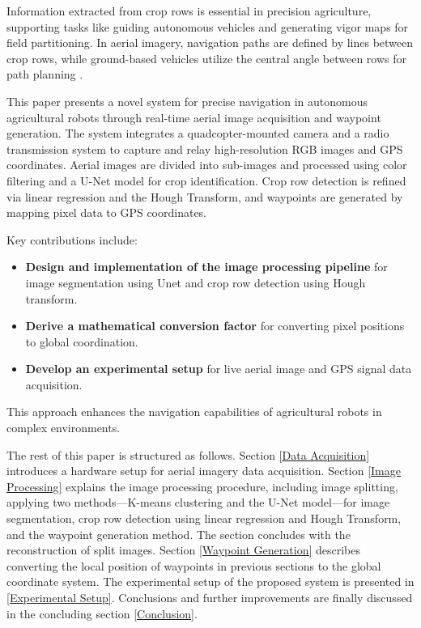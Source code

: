 \documentclass[conference]{IEEEtran}
\begin{document}
	Information extracted from crop rows is essential in precision agriculture, supporting tasks like guiding autonomous vehicles and generating vigor maps for field partitioning. In aerial imagery, navigation paths are defined by lines between crop rows, while ground-based vehicles utilize the central angle between rows for path planning \cite{b11,b1}.
	
	
	
	This paper presents a novel system for precise navigation in autonomous agricultural robots through real-time aerial image acquisition and waypoint generation. The system integrates a quadcopter-mounted camera and a radio transmission system to capture and relay high-resolution RGB images and GPS coordinates. Aerial images are divided into sub-images and processed using color filtering and a U-Net model for crop identification. Crop row detection is refined via linear regression and the Hough Transform, and waypoints are generated by mapping pixel data to GPS coordinates. 
	
	Key contributions include: 
	
	\begin{itemize}
		
		\item \textbf{Design and implementation of the image processing pipeline} for image segmentation using Unet and crop row detection using Hough transform.
		\item \textbf{Derive a mathematical conversion factor} for converting pixel positions to global coordination.
		\item \textbf{Develop an experimental setup} for live aerial image and GPS signal data acquisition.
	\end{itemize}
	
	This approach enhances the navigation capabilities of agricultural robots in complex environments.
	
	The rest of this paper is structured as follows. Section \ref{Data Acquisition} introduces a hardware setup for aerial imagery data acquisition. Section \ref{Image Processing} explains the image processing procedure, including image splitting, applying two methods—K-means clustering and the U-Net model—for image segmentation, crop row detection using linear regression and Hough Transform, and the waypoint generation method. The section concludes with the reconstruction of split images. Section \ref{Waypoint Generation} describes converting the local position of waypoints in previous sections to the global coordinate system. The experimental setup of the proposed system is presented in \ref{Experimental Setup}. Conclusions and further improvements are finally discussed in the concluding section
	\ref{Conclusion}.
	
\end{document}
